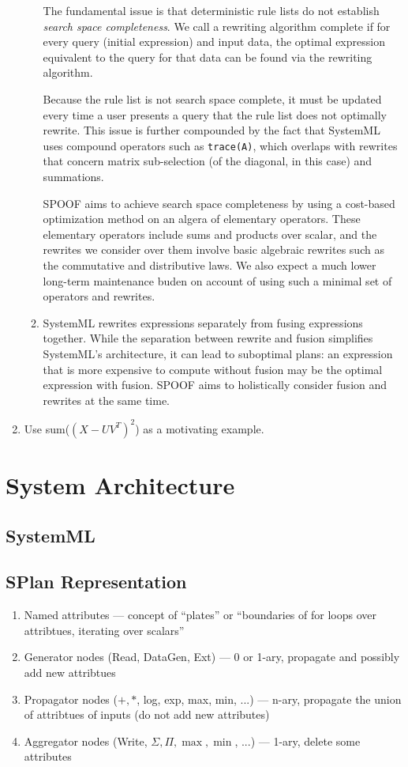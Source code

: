 \documentclass{vldb}
\begin{document}
\begin{enumerate}
\begin{enumerate}
  The fundamental issue is that deterministic rule lists do not establish \emph{search space completeness}.
  We call a rewriting algorithm complete if for every query (initial expression) and input data, the optimal expression equivalent to the query for that data can be found via the rewriting algorithm.
  
  Because the rule list is not search space complete, it must be updated every time a user presents a query that the rule list does not optimally rewrite. This issue is further compounded by the fact that SystemML uses compound operators such as \texttt{trace(A)}, which overlaps with rewrites that concern matrix sub-selection (of the diagonal, in this case) and summations.

  SPOOF aims to achieve search space completeness by using a cost-based optimization method on an algera of elementary operators. These elementary operators include sums and products over scalar, and the rewrites we consider over them involve basic algebraic rewrites such as the commutative and distributive laws. We also expect a much lower long-term maintenance buden on account of using such a minimal set of operators and rewrites.
  \item SystemML rewrites expressions separately from fusing expressions together. While the separation between rewrite and fusion simplifies SystemML's architecture, it can lead to suboptimal plans: an expression that is more expensive to compute without fusion may be the optimal expression with fusion.
  SPOOF aims to holistically consider fusion and rewrites at the same time.
  \end{enumerate}
\item Use sum($(X - UV^T)^2$) as a motivating example.

\end{enumerate}

\section{System Architecture}
\label{sec:sysarch}

\subsection{SystemML}

\subsection{SPlan Representation}
\begin{enumerate}
\item Named attributes --- concept of ``plates'' or ``boundaries of for loops over attribtues, iterating over scalars''
\item Generator nodes (Read, DataGen, Ext) --- 0 or 1-ary, propagate and possibly add new attribtues
\item Propagator nodes ($+, *$, log, exp, max, min, ...) --- n-ary, propagate the union of attribtues of inputs (do not add new attributes)
\item Aggregator nodes (Write, $\Sigma, \Pi, \max, \min$, ...) --- 1-ary, delete some attributes
\end{enumerate}
\end{document}
